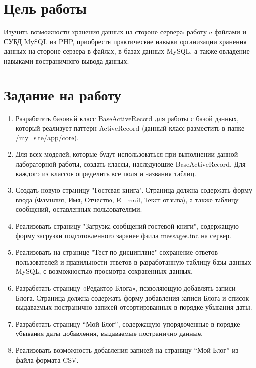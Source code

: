 \documentclass[a4paper,14pt]{extarticle}
\begin{document}


\section{Цель работы}
Изучить возможности хранения данных на стороне сервера: работу c файлами и СУБД
MySQL из PHP, приобрести практические навыки организации хранения данных на
стороне сервера в файлах, в базах данных MySQL, а также овладение навыками
постраничного вывода данных.

\section{Задание на работу}
\begin{enumerate}
    \item Разработать базовый класс BaseActiveRecord для работы с базой данных,
          который реализует паттерн ActiveRecord (данный класс разместить в
          папке \slash my\_site\slash app\slash core).
    \item Для всех моделей, которые будут использоваться при выполнении данной
          лабораторной работы, создать классы, наследующие BaseActiveRecord. Для
          каждого из классов определить все поля и названия таблиц.
    \item Создать новую страницу "Гостевая книга". Страница должна содержать
          форму ввода (Фамилия, Имя, Отчество, E –mail, Текст отзыва), а также таблицу
          сообщений, оставленных пользователями.
    \item Реализовать страницу "Загрузка сообщений гостевой книги", содержащую
          форму загрузки подготовленного заранее файла messages.inc на сервер.
    \item Реализовать на странице "Тест по дисциплине" сохранение ответов
          пользователей и правильности ответов в разработанную таблицу базы данных
          MySQL, с возможностью просмотра сохраненных данных.
    \item Разработать страницу «Редактор Блога», позволяющую добавлять записи
          Блога. Страница должна содержать форму добавления записи Блога и список
          выдаваемых постранично записей отсортированных в порядке убывания даты.
    \item Разработать страницу \enquote{Мой Блог}, содержащую упорядоченные в порядке
          убывания даты добавления, выдаваемые постранично данные.
    \item Реализовать возможность добавления записей на страницу \enquote{Мой Блог} из
          файла формата CSV.
\end{enumerate}
\pagebreak
\end{document}
